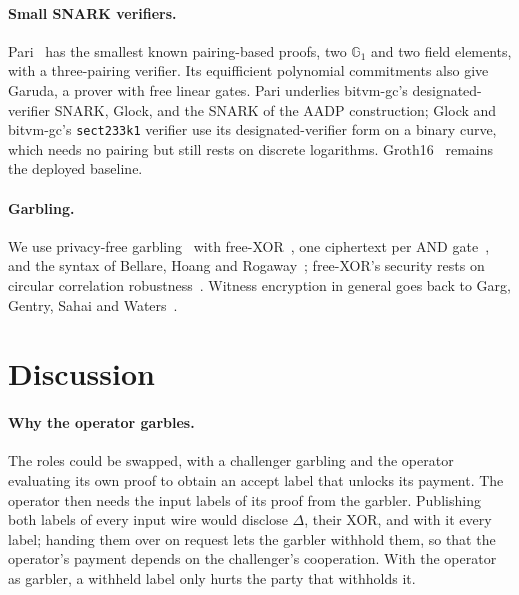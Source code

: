 \documentclass[11pt]{article}
\newcommand{\AND}{\textsf{AND}}
\begin{document}
\paragraph{Small SNARK verifiers.} Pari~\cite{garudapari} has the smallest known
pairing-based proofs, two $\mathbb{G}_1$ and two field elements, with a
three-pairing verifier. Its equifficient polynomial commitments also give Garuda,
a prover with free linear gates. Pari underlies bitvm-gc's designated-verifier
SNARK, Glock, and the SNARK of the AADP construction; Glock and bitvm-gc's
\texttt{sect233k1} verifier use its designated-verifier form on a binary curve,
which needs no pairing but still rests on discrete logarithms. Groth16~\cite{gro16} remains
the deployed baseline.

\paragraph{Garbling.} We use privacy-free garbling~\cite{fno15privacyfree} with
free-XOR~\cite{ks08}, one ciphertext per \AND{} gate~\cite{zre15}, and the syntax
of Bellare, Hoang and Rogaway~\cite{bhr12foundations}; free-XOR's security rests on
circular correlation robustness~\cite{ckkz12freexor}. Witness encryption in general
goes back to Garg, Gentry, Sahai and Waters~\cite{ggsw13}.

\section{Discussion}\label{sec:discussion}

\paragraph{Why the operator garbles.} The roles could be swapped, with a
challenger garbling and the operator evaluating its own proof to obtain an accept
label that unlocks its payment. The operator then needs the input labels of its
proof from the garbler. Publishing both labels of every input wire would disclose
$\Delta$, their XOR, and with it every label; handing them over on request lets
the garbler withhold them, so that the operator's payment depends on the
challenger's cooperation. With the operator as garbler, a withheld label only
hurts the party that withholds it.
\end{document}
